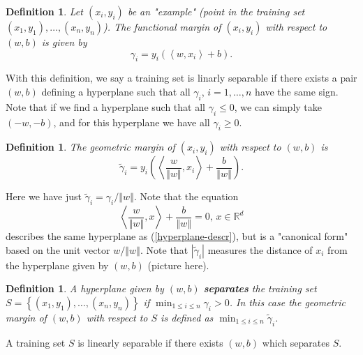 \documentclass[11pt,twoside]{article}%
\theoremstyle{change}
\newtheorem{definition}[theorem]{Definition}
\begin{document}
\begin{definition}
Let $\left(  x_{i},y_{i}\right)  $ be an "example" (point in the training set
$\left(  x_{1},y_{1}\right)  ,\ldots,\left(  x_{n},y_{n}\right)  $). The
functional margin of $\left(  x_{i},y_{i}\right)  $ with respect to $\left(
w,b\right)  $ is given by
\[
\gamma_{i}=y_{i}\left(  \left\langle w,x_{i}\right\rangle +b\right)  .
\]

\end{definition}

With this definition, we say a training set is linarly separable if there
exists a pair $\left(  w,b\right)  $ defining a hyperplane such that all
$\gamma_{i}$, $i=1,\ldots,n$ have the same sign. Note that if we find a
hyperplane such that all $\gamma_{i}\leq0$, we can simply take $\left(
-w,-b\right)  $, and for this hyperplane we have all $\gamma_{i}\geq0$.

\begin{definition}
The geometric margin of $\left(  x_{i},y_{i}\right)  $ with respect to
$\left(  w,b\right)  $ is
\[
\tilde{\gamma}_{i}=y_{i}\left(  \left\langle \frac{w}{\left\Vert w\right\Vert
},x_{i}\right\rangle +\frac{b}{\left\Vert w\right\Vert }\right)  .
\]

\end{definition}

\bigskip Here we have just $\tilde{\gamma}_{i}=\gamma_{i}/\left\Vert
w\right\Vert $. Note that the equation%
\[
\left\langle \frac{w}{\left\Vert w\right\Vert },x\right\rangle +\frac
{b}{\left\Vert w\right\Vert }=0\text{, }x\in\mathbb{R}^{d}%
\]
describes the same hyperplane as (\ref{hyperplane-descr}), but is a "canonical
form" based on the unit vector $w/\left\Vert w\right\Vert $. Note that
$\left\vert \tilde{\gamma}_{i}\right\vert $ measures the distance of $x_{i}$
from the hyperplane given by $\left(  w,b\right)  $ (picture here).

\begin{definition}
A hyperplane given by $\left(  w,b\right)  $ \textbf{separates} the training
set $S=\left\{  \left(  x_{1},y_{1}\right)  ,\ldots,\left(  x_{n}%
,y_{n}\right)  \right\}  $ if $\min_{1\leq i\leq n}\gamma_{i}>0$. In this case
the geometric margin of $\left(  w,b\right)  $ with respect to $S$ is defined
as $\min_{1\leq i\leq n}\tilde{\gamma}_{i}$.
\end{definition}

A training set $S$ is linearly separable if there exists $\left(  w,b\right)
$ which separates $S$.
\end{document}
